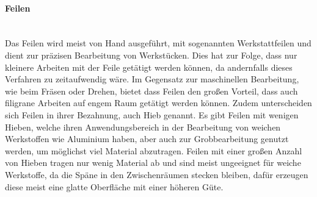 \paragraph{Feilen}\mbox{}\\
Das Feilen wird meist von Hand ausgeführt, mit sogenannten Werkstattfeilen und dient zur präzisen Bearbeitung von Werkstücken. Dies hat zur Folge, dass nur 
kleinere Arbeiten mit der Feile getätigt werden können, da andernfalls dieses Verfahren zu zeitaufwendig wäre. Im Gegensatz zur maschinellen Bearbeitung, 
wie \zB beim Fräsen oder Drehen, bietet dass Feilen den großen Vorteil, dass auch filigrane Arbeiten auf engem Raum getätigt werden können. Zudem 
unterscheiden sich Feilen in ihrer Bezahnung, auch Hieb genannt. Es gibt Feilen mit wenigen Hieben, welche ihren Anwendungsbereich in der Bearbeitung 
von weichen Werkstoffen wie Aluminium haben, aber auch zur Grobbearbeitung genutzt werden, um möglichst viel Material abzutragen. Feilen mit einer großen 
Anzahl von Hieben tragen nur wenig Material ab und sind meist ungeeignet für weiche Werkstoffe, da die Späne in den Zwischenräumen stecken bleiben, dafür 
erzeugen diese meist eine glatte Oberfläche mit einer höheren Güte. %
